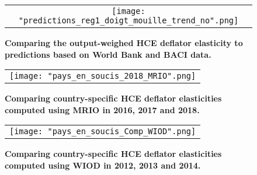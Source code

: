 \documentclass[12pt,a4paper]{article}
\begin{document}
\begin{figure}[H]
	\centering
	\caption{\footnotesize{\textbf{Comparing the output-weighed HCE deflator elasticity to predictions based on World Bank and BACI data.}}}
	\begin{tabular}{c}
		\texttt{[image: "predictions\_reg1\_doigt\_mouille\_trend\_no".png]}\\
	\end{tabular}
	\label{fig:panel_pred3}
\end{figure}

\begin{figure}[H]
	\centering
	\caption{\footnotesize{\textbf{Comparing country-specific HCE deflator elasticities computed using MRIO in 2016, 2017 and 2018.}}}
	\begin{tabular}{c}
		\texttt{[image: "pays\_en\_soucis\_2018\_MRIO".png]}\\
	\end{tabular}
	\label{fig:pays_soucis_MRIO}
\end{figure}

\begin{figure}[H]
	\centering
	\caption{\footnotesize{\textbf{Comparing country-specific HCE deflator elasticities computed using WIOD in 2012, 2013 and 2014.}}}
	\begin{tabular}{c}
		\texttt{[image: "pays\_en\_soucis\_Comp\_WIOD".png]}\\
	\end{tabular}
	\label{fig:pays_soucis_WIOD}
\end{figure}
\end{document}
